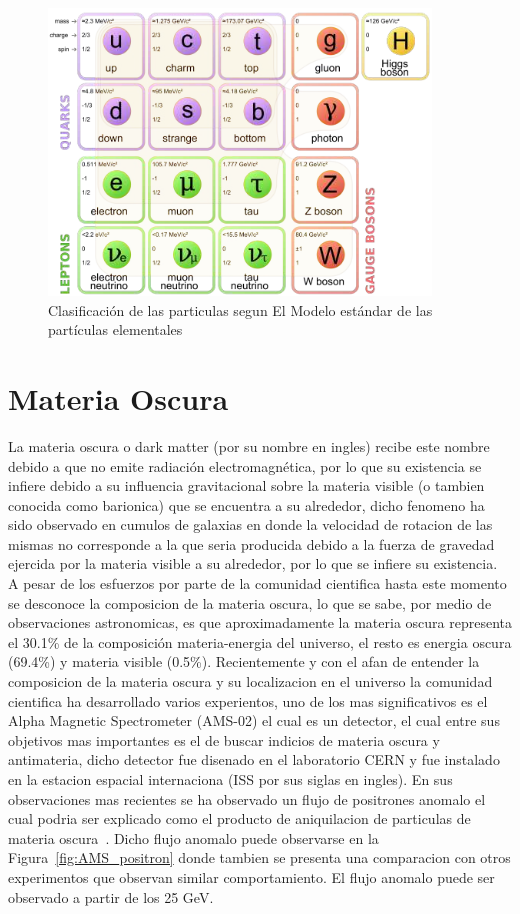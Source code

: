 \begin{figure}
\begin{center}
  \includegraphics[width=4.0in]{standard-model.png}
  \caption{Clasificaci\'on de las particulas segun El Modelo est\'andar de las part\'iculas elementales}
  \label{fig:ME}
\end{center}
\end{figure}


\section{Materia Oscura}

La materia oscura o dark matter (por su nombre en ingles) recibe este nombre debido a que no emite radiaci\'on electromagn\'etica, por lo que su existencia se infiere debido a su influencia gravitacional sobre la materia visible (o tambien conocida como barionica) que se encuentra a su alrededor, dicho fenomeno ha sido observado en cumulos de galaxias en donde la velocidad de rotacion de las mismas no corresponde a la que seria producida debido a la fuerza de gravedad ejercida por la materia visible a su alrededor, por lo que se infiere su existencia. A pesar de los esfuerzos por parte de la comunidad cientifica hasta este momento se desconoce la composicion de la materia oscura, lo que se sabe, por medio de observaciones astronomicas, es que aproximadamente la materia oscura representa el 30.1\%  de la composici\'on materia-energia del universo, el resto es energia oscura (69.4\%) y materia visible (0.5\%). Recientemente y con el afan de entender la composicion de la materia oscura y su localizacion en el universo la comunidad cientifica ha desarrollado varios experientos, uno de los mas significativos es el Alpha Magnetic Spectrometer (AMS-02) el cual es un detector, el cual entre sus objetivos mas importantes es el de buscar indicios de materia oscura y antimateria, dicho detector fue disenado en el laboratorio CERN y fue instalado en la estacion espacial internaciona (ISS por sus siglas en ingles). En sus observaciones mas recientes se ha observado un flujo de positrones anomalo el cual podria ser explicado como el producto de aniquilacion de particulas de materia oscura~\cite{ams:cern}.  Dicho flujo anomalo puede observarse en la Figura~\ref{fig:AMS_positron} donde tambien se presenta una comparacion con otros experimentos que observan similar comportamiento.  El flujo anomalo puede ser observado a partir de los 25 GeV. 

